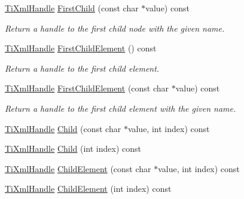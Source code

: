 \begin{DoxyCompactItemize}
\hypertarget{class_ti_xml_handle_a586ebaca4a4d0909db65a765d95d5e59}{}\label{class_ti_xml_handle_a586ebaca4a4d0909db65a765d95d5e59} 
\hyperlink{class_ti_xml_handle}{Ti\+Xml\+Handle} \hyperlink{class_ti_xml_handle_a586ebaca4a4d0909db65a765d95d5e59}{First\+Child} (const char $\ast$value) const
\begin{DoxyCompactList}\small\item\em Return a handle to the first child node with the given name. \end{DoxyCompactList}\item 
\hypertarget{class_ti_xml_handle_af0643f8683f3f2b779b8c9d78c67b2c0}{}\label{class_ti_xml_handle_af0643f8683f3f2b779b8c9d78c67b2c0} 
\hyperlink{class_ti_xml_handle}{Ti\+Xml\+Handle} \hyperlink{class_ti_xml_handle_af0643f8683f3f2b779b8c9d78c67b2c0}{First\+Child\+Element} () const
\begin{DoxyCompactList}\small\item\em Return a handle to the first child element. \end{DoxyCompactList}\item 
\hypertarget{class_ti_xml_handle_a3eaf2d2d4c087cd8a48da261042e75bc}{}\label{class_ti_xml_handle_a3eaf2d2d4c087cd8a48da261042e75bc} 
\hyperlink{class_ti_xml_handle}{Ti\+Xml\+Handle} \hyperlink{class_ti_xml_handle_a3eaf2d2d4c087cd8a48da261042e75bc}{First\+Child\+Element} (const char $\ast$value) const
\begin{DoxyCompactList}\small\item\em Return a handle to the first child element with the given name. \end{DoxyCompactList}\item 
\hyperlink{class_ti_xml_handle}{Ti\+Xml\+Handle} \hyperlink{class_ti_xml_handle_a9903b035444ee36450fe00ede403f920}{Child} (const char $\ast$value, int index) const
\item 
\hyperlink{class_ti_xml_handle}{Ti\+Xml\+Handle} \hyperlink{class_ti_xml_handle_a32585942abb28e03eea9c5223f38a659}{Child} (int index) const
\item 
\hyperlink{class_ti_xml_handle}{Ti\+Xml\+Handle} \hyperlink{class_ti_xml_handle_afccc59d8a0daa8c5d78474fbed430ddb}{Child\+Element} (const char $\ast$value, int index) const
\item 
\hyperlink{class_ti_xml_handle}{Ti\+Xml\+Handle} \hyperlink{class_ti_xml_handle_a57a639ab0ac99ff9358f675a1b73049a}{Child\+Element} (int index) const
\item 
\hypertarget{class_ti_xml_handle_afd813aae06c0449b04ccf0237076495e}{}\label{class_ti_xml_handle_afd813aae06c0449b04ccf0237076495e} 

\end{DoxyCompactItemize}
